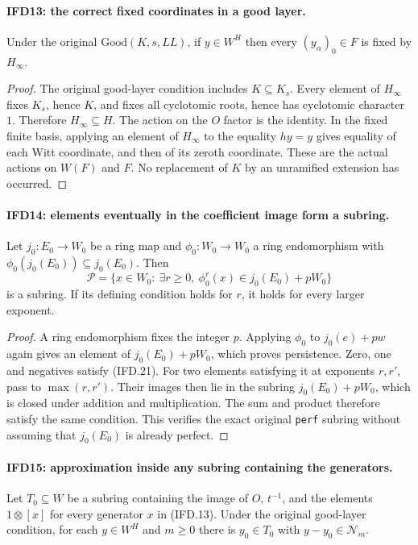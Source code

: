 \documentclass[11pt,a4paper]{article}
\numberwithin{equation}{section}
\theoremstyle{remark}\newtheorem{remark}[theorem]{Remark}
\begin{document}
\paragraph{IFD13: the correct fixed coordinates in a good layer.}
\label{claim:IFD13}
Under the original $\mathrm{Good}(K,s,LL)$, if $y\in W^H$ then
every $(y_\alpha)_0\in F$ is fixed by $H_\infty$.

\begin{proof}
The original good-layer condition includes $K\subseteq K_s$.
Every element of $H_\infty$ fixes $K_s$, hence $K$, and fixes
all cyclotomic roots, hence has cyclotomic character $1$.
Therefore $H_\infty\subseteq H$.
The action on the $O$ factor is the identity. In the fixed finite
basis, applying an element of $H_\infty$ to the equality $hy=y$
gives equality of each Witt coordinate, and then of its zeroth
coordinate. These are the actual actions on $W(F)$ and $F$.
No replacement of $K$ by an unramified extension has occurred.
\end{proof}

\paragraph{IFD14: elements eventually in the coefficient image form a subring.}
\label{claim:IFD14}
Let $j_0:E_0\to W_0$ be a ring map and $\phi_0:W_0\to W_0$
a ring endomorphism with $\phi_0(j_0(E_0))\subseteq j_0(E_0)$.
Then
\[
 \mathcal P=\{x\in W_0:\ \exists r\geq0,\
                    \phi_0^r(x)\in j_0(E_0)+pW_0\}         \tag{IFD.21}
\]
is a subring. If its defining condition holds for $r$, it holds
for every larger exponent.

\begin{proof}
A ring endomorphism fixes the integer $p$. Applying $\phi_0$
to $j_0(e)+pw$ again gives an element of $j_0(E_0)+pW_0$,
which proves persistence. Zero, one and negatives satisfy (IFD.21).
For two elements satisfying it at exponents $r,r'$, pass to
$\max(r,r')$. Their images then lie in the subring
$j_0(E_0)+pW_0$, which is closed under addition and multiplication.
The sum and product therefore satisfy the same condition.
This verifies the exact original \texttt{perf} subring without
assuming that $j_0(E_0)$ is already perfect.
\end{proof}

\paragraph{IFD15: approximation inside any subring containing the generators.}
\label{claim:IFD15}
Let $T_0\subseteq W$ be a subring containing the image of $O$,
$t^{-1}$, and the elements $1\otimes[x]$ for every generator $x$
in (IFD.13). Under the original good-layer condition, for each
$y\in W^H$ and $m\geq0$ there is $y_0\in T_0$ with
$y-y_0\in\mathcal N_m$.
\end{document}
